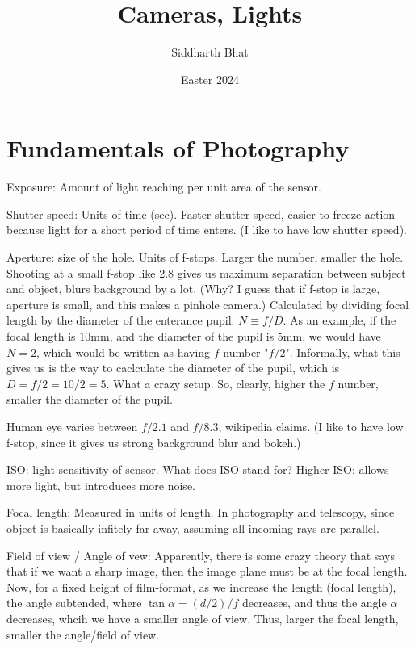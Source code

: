 \documentclass[11pt]{book}
\title{Cameras, Lights}
\author{Siddharth Bhat}
\date{Easter 2024}
\begin{document}
\maketitle
\tableofcontents

%



\chapter{Fundamentals of Photography}

Exposure: Amount of light reaching per unit area of the sensor.


Shutter speed:
Units of time (sec). Faster shutter speed, easier to freeze action because light for a short period of time enters.
(I like to have low shutter speed).

Aperture: size of the hole. Units of f-stops. Larger the number, smaller the hole. 
Shooting at a small f-stop like 2.8 gives us maximum separation between subject and object, blurs background by a lot.
(Why? I guess that if f-stop is large, aperture is small, and this makes a pinhole camera.)
Calculated by dividing focal length by the diameter of the enterance pupil. $N \equiv f / D$.
As an example, if the focal length is $10$mm, and the diameter of the pupil is $5$mm, we would have $N = 2$, which would be 
written as having $f$-number "$f/2$". Informally, what this gives us is the way to caclculate the diameter of the pupil,
which is $D = f/2 = 10/2 = 5$. What a crazy setup. So, clearly, higher the $f$ number, smaller the diameter of the pupil.


Human eye varies between $f/2.1$ and $f/8.3$, wikipedia claims.
(I like to have low f-stop, since it gives us strong background blur and bokeh.)


ISO: light sensitivity of sensor.
What does ISO stand for?
Higher ISO: allows more light, but introduces more noise.

Focal length:
Measured in units of length.
In photography and telescopy, since object is basically infitely far away, assuming all incoming rays are parallel.

Field of view / Angle of vew:
Apparently, there is some crazy theory that says that if we want a sharp image, then the image plane must be at the focal length.
Now, for a fixed height of film-format, as we increase the length (focal length), the angle subtended, where $\tan \alpha = (d/2)/f$ decreases,
and thus the angle $\alpha$ decreases, whcih we have a smaller angle of view.
Thus, larger the focal length, smaller the angle/field of view.
\end{document}
